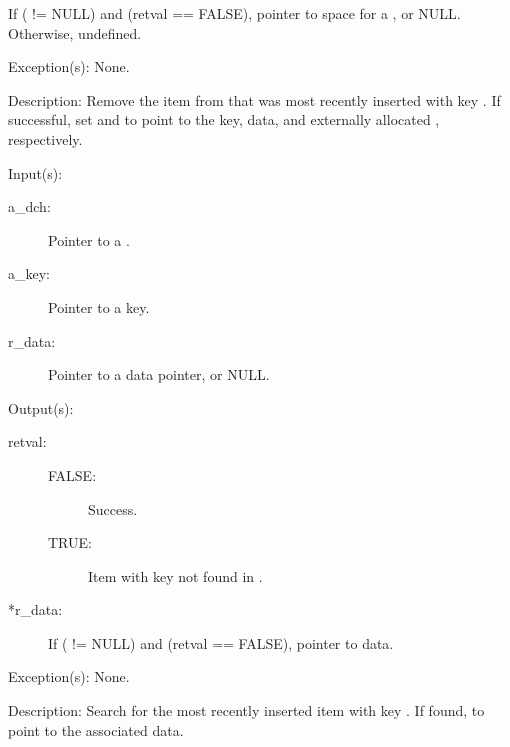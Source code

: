 \begin{capi}
\begin{capilist}
\begin{description}
			If ( != NULL) and (retval == FALSE),
			pointer to space for a , or NULL.
			Otherwise, undefined.
		\end{description}
	\item[Exception(s): ] None.
	\item[Description: ]
		Remove the item from  that was most recently
		inserted with key .  If successful, set
		 and  to point to the key, data,
		and externally allocated , respectively.
	\end{capilist}
\label{dch_search}
	\begin{capilist}
	\item[Input(s): ]
		\begin{description}\item[]
		\item[a\_dch: ]
			Pointer to a .
		\item[a\_key: ]
			Pointer to a key.
		\item[r\_data: ]
			Pointer to a data pointer, or NULL.
		\end{description}
	\item[Output(s): ]
		\begin{description}\item[]
		\item[retval: ]
			\begin{description}\item[]
			\item[FALSE: ]
				Success.
			\item[TRUE: ]
				Item with key  not found in
				.
			\end{description}
		\item[*r\_data: ]
			If ( != NULL) and (retval == FALSE),
			pointer to data.
		\end{description}
	\item[Exception(s): ] None.
	\item[Description: ]
		Search for the most recently inserted item with key
		.  If found,  to point to the
		associated data.
	\end{capilist}
\label{dch_get_iterate}

\end{capi}

